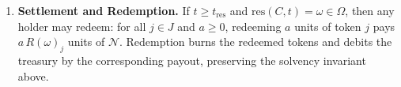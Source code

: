 \begin{definition}
\begin{enumerate}
Units of each token type are fungible: for all $j\in J$, any $\omega\in\Omega$, and any $a\ge 0$, $a$ units of token $j$ entitle the holder to $a\,R(\omega)_j$ units of $\mathcal{N}$ if the realized outcome is $\omega$.

\item \textbf{Settlement and Redemption.}
If $t\ge t_{\mathrm{res}}$ and $\mathrm{res}(C,t)=\omega\in\Omega$, then any holder may redeem: for all $j\in J$ and $a\ge 0$, redeeming $a$ units of token $j$ pays $a\,R(\omega)_j$ units of $\mathcal{N}$. 
Redemption burns the redeemed tokens and debits the treasury by the corresponding payout, preserving the solvency invariant above.
 
 \end{enumerate}
 \end{definition}
 



